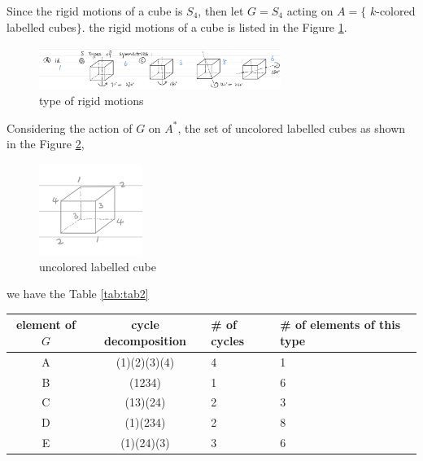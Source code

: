 \begin{answer}
    Since the rigid motions of a cube is $S_4$, then let $G = S_4$ acting on $A=\{$ $k$-colored labelled cubes$\}$. the rigid motions of a cube is listed in the Figure \ref{fig:fig2}.
    \begin{figure}[H]
        \centering
        \includegraphics[width=0.7\textwidth]{Figure 2.jpg}
        \caption{\label{fig:fig2}type of rigid motions}
    \end{figure}
    Considering the action of $G$ on $A^*$, the set of uncolored labelled cubes as shown in the Figure \ref{fig:fig1}, 
    \begin{figure}[H]
        \centering
        \includegraphics[width=0.3\textwidth]{Figure 1.jpg}
        \caption{\label{fig:fig1}uncolored labelled cube}
    \end{figure}
    we have the Table \ref{tab:tab2}
    \begin{table}[H]
    \centering
        \begin{tabular}{|c|c|l|l|}
        \hline
        \textbf{element of $G$} & \textbf{cycle decomposition} & \textbf{\# of cycles} & \textbf{\# of elements of this type} \\ \hline
        A                       & (1)(2)(3)(4)                 & 4                     & 1                                    \\ \hline
        B                       & (1234)                       & 1                     & 6                                    \\ \hline
        C                       & (13)(24)                     & 2                     & 3                                    \\ \hline
        D                       & (1)(234)                     & 2                     & 8                                    \\ \hline
        E                       & (1)(24)(3)                   & 3                     & 6                                    \\ \hline

\end{tabular}
\end{table}
\end{answer}
